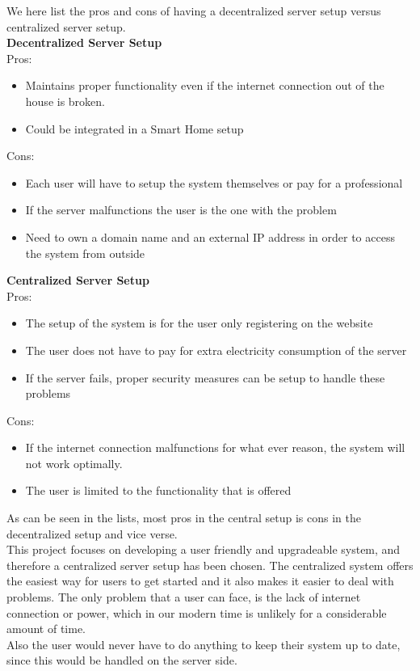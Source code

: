 We here list the pros and cons of having a decentralized server setup versus centralized server setup.\\

\textbf{Decentralized Server Setup}\\
Pros:
\begin{itemize}
	\item Maintains proper functionality even if the internet connection out of the house is broken.
	\item Could be integrated in a Smart Home setup
\end{itemize}

Cons:
\begin{itemize}
	\item Each user will have to setup the system themselves or pay for a professional
  \item If the server malfunctions the user is the one with the problem
  \item Need to own a domain name and an external IP address in order to access the system from outside
\end{itemize}

\textbf{Centralized Server Setup}\\
Pros:
\begin{itemize}
	\item The setup of the system is for the user only registering on the website
	\item The user does not have to pay for extra electricity consumption of the server
	\item If the server fails, proper security measures can be setup to handle these problems
\end{itemize}

Cons:
\begin{itemize}
	\item If the internet connection malfunctions for what ever reason, the system will not work optimally.
  \item The user is limited to the functionality that is offered
\end{itemize}

As can be seen in the lists, most pros in the central setup is cons in the decentralized setup and vice verse.\\
This project focuses on developing a user friendly and upgradeable system, and therefore a centralized server setup has been chosen. The centralized system offers the easiest way for users to get started and it also makes it easier to deal with problems. The only problem that a user can face, is the lack of internet connection or power, which in our modern time is unlikely for a considerable amount of time.\\
Also the user would never have to do anything to keep their system up to date, since this would be handled on the server side.
